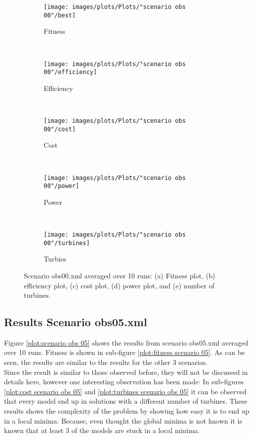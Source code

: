 \begin{figure}[h!]
    \centering
      \begin{subfigure}[b]{0.31\textwidth}
        \texttt{[image: images/plots/Plots/"scenario obs 00"/best]}
        \caption{Fitness}
        \hfill
        \label{plot:fitness plot scenario obs 00}
    \end{subfigure}
    ~
      \begin{subfigure}[b]{0.31\textwidth}
        \texttt{[image: images/plots/Plots/"scenario obs 00"/efficiency]}
        \caption{Efficiency}
        \hfill
        \label{plot:efficiency plot scenario obs 00}
    \end{subfigure}
    ~
    \begin{subfigure}[b]{0.31\textwidth}
        \texttt{[image: images/plots/Plots/"scenario obs 00"/cost]}
        \caption{Cost}
        \hfill
        \label{plot:cost plot scenario obs 00}
    \end{subfigure}
    ~
    \begin{subfigure}[b]{0.31\textwidth}
        \texttt{[image: images/plots/Plots/"scenario obs 00"/power]}
        \caption{Power}
        \hfill
        \label{plot:power plot scenario obs 00}
    \end{subfigure}
    ~
    \begin{subfigure}[b]{0.31\textwidth}
        \texttt{[image: images/plots/Plots/"scenario obs 00"/turbines]}
        \caption{Turbies}
        \hfill
        \label{plot:turbines plot scenario obs 00}
    \end{subfigure}
    \caption{Scenario obs00.xml averaged over 10 runs: (a) Fitness plot, (b) efficiency plot, (c) cost plot, (d) power plot, and (e) number of turbines.}
    \label{plot:scenario obs 00}
\end{figure}


\subsection{Results Scenario obs05.xml}


\noindent Figure \ref{plot:scenario obs 05} shows the results from scenario obs05.xml averaged over 10 runs. Fitness is shown in sub-figure \ref{plot:fitness scenario 05}. As can be seen, the results are similar to the results for the other 3 scenarios.\\


\noindent Since the result is similar to those observed before, they will not be discussed in details here, however one interesting observation has been made: In sub-figures \ref{plot:cost scenario obs 05} and \ref{plot:turbines scenario obs 05} it can be observed that every model end up in solutions with a different number of turbines. These results shows the complexity of the problem by showing how easy it is to end up in a local minima. Because, even thought the global minima is not known it is known that at least 3 of the models are stuck in a local minima.  \\


